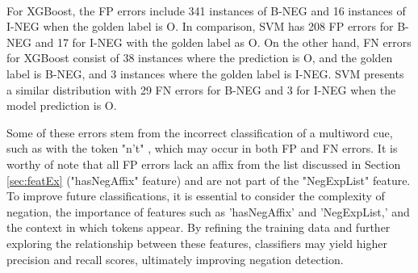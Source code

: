 \\

For XGBoost, the FP errors include 341 instances of B-NEG and 16 instances of I-NEG when the golden label is O. In comparison, SVM has 208 FP errors for B-NEG and 17 for I-NEG with the golden label as O. On the other hand, FN errors for XGBoost consist of 38 instances where the prediction is O, and the golden label is B-NEG, and 3 instances where the golden label is I-NEG. SVM presents a similar distribution with 29 FN errors for B-NEG and 3 for I-NEG when the model prediction is O.




Some of these errors stem from the incorrect classification of a multiword cue, such as with the token "n't" \cite{cruz2016machine}, which may occur in both FP and FN errors. It is worthy of note that all FP errors lack an affix from the list discussed in Section \ref{sec:featEx} ("hasNegAffix" feature) and are not part of the "NegExpList" feature.
\\

To improve future classifications, it is essential to consider the complexity of negation, the importance of features such as 'hasNegAffix' and 'NegExpList,' and the context in which tokens appear. By refining the training data and further exploring the relationship between these features, classifiers may yield higher precision and recall scores, ultimately improving negation detection.
